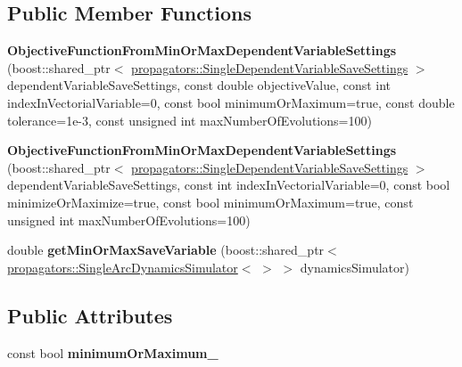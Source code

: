 \subsection*{Public Member Functions}
\begin{DoxyCompactItemize}
\item 
{\bfseries Objective\+Function\+From\+Min\+Or\+Max\+Dependent\+Variable\+Settings} (boost\+::shared\+\_\+ptr$<$ \hyperlink{classtudat_1_1propagators_1_1SingleDependentVariableSaveSettings}{propagators\+::\+Single\+Dependent\+Variable\+Save\+Settings} $>$ dependent\+Variable\+Save\+Settings, const double objective\+Value, const int index\+In\+Vectorial\+Variable=0, const bool minimum\+Or\+Maximum=true, const double tolerance=1e-\/3, const unsigned int max\+Number\+Of\+Evolutions=100)\hypertarget{structtudat_1_1optimization_1_1ObjectiveFunctionFromMinOrMaxDependentVariableSettings_a1500315db989ebbfcbced245c28155be}{}\label{structtudat_1_1optimization_1_1ObjectiveFunctionFromMinOrMaxDependentVariableSettings_a1500315db989ebbfcbced245c28155be}

\item 
{\bfseries Objective\+Function\+From\+Min\+Or\+Max\+Dependent\+Variable\+Settings} (boost\+::shared\+\_\+ptr$<$ \hyperlink{classtudat_1_1propagators_1_1SingleDependentVariableSaveSettings}{propagators\+::\+Single\+Dependent\+Variable\+Save\+Settings} $>$ dependent\+Variable\+Save\+Settings, const int index\+In\+Vectorial\+Variable=0, const bool minimize\+Or\+Maximize=true, const bool minimum\+Or\+Maximum=true, const unsigned int max\+Number\+Of\+Evolutions=100)\hypertarget{structtudat_1_1optimization_1_1ObjectiveFunctionFromMinOrMaxDependentVariableSettings_aa3d3afdb0316f27dcb01d3f79bc18820}{}\label{structtudat_1_1optimization_1_1ObjectiveFunctionFromMinOrMaxDependentVariableSettings_aa3d3afdb0316f27dcb01d3f79bc18820}

\item 
double {\bfseries get\+Min\+Or\+Max\+Save\+Variable} (boost\+::shared\+\_\+ptr$<$ \hyperlink{classtudat_1_1propagators_1_1SingleArcDynamicsSimulator}{propagators\+::\+Single\+Arc\+Dynamics\+Simulator}$<$  $>$ $>$ dynamics\+Simulator)\hypertarget{structtudat_1_1optimization_1_1ObjectiveFunctionFromMinOrMaxDependentVariableSettings_a5abb643846463a2ed16a494c7c349f2a}{}\label{structtudat_1_1optimization_1_1ObjectiveFunctionFromMinOrMaxDependentVariableSettings_a5abb643846463a2ed16a494c7c349f2a}

\end{DoxyCompactItemize}
\subsection*{Public Attributes}
\begin{DoxyCompactItemize}
\item 
const bool {\bfseries minimum\+Or\+Maximum\+\_\+}\hypertarget{structtudat_1_1optimization_1_1ObjectiveFunctionFromMinOrMaxDependentVariableSettings_af552234ec3d9cbdb7cc2300625685378}{}\label{structtudat_1_1optimization_1_1ObjectiveFunctionFromMinOrMaxDependentVariableSettings_af552234ec3d9cbdb7cc2300625685378}

\end{DoxyCompactItemize}


